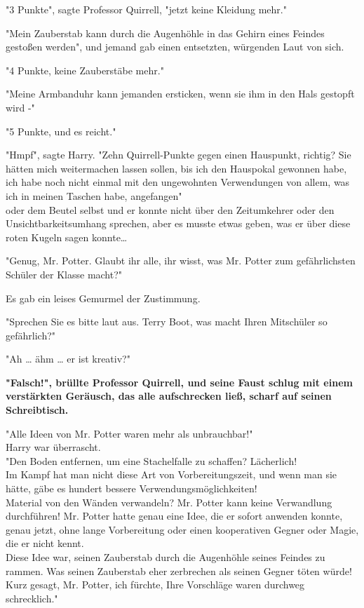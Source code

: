 {"3 Punkte", sagte Professor Quirrell, "jetzt keine Kleidung mehr."

"Mein Zauberstab kann durch die Augenhöhle in das Gehirn eines Feindes gestoßen werden", und jemand gab einen entsetzten, würgenden Laut von sich.

"4 Punkte, keine Zauberstäbe mehr."

"Meine Armbanduhr kann jemanden ersticken, wenn sie ihm in den Hals gestopft wird -"

"5 Punkte, und es reicht."

"Hmpf", sagte Harry. "Zehn Quirrell-Punkte gegen einen Hauspunkt, richtig? Sie hätten mich weitermachen lassen sollen, bis ich den Hauspokal gewonnen habe, ich habe noch nicht einmal mit den ungewohnten Verwendungen von allem, was ich in meinen Taschen habe, angefangen"\\ oder dem Beutel selbst und er konnte nicht über den Zeitumkehrer oder den Unsichtbarkeitsumhang sprechen, aber es musste etwas geben, was er über diese roten Kugeln sagen konnte…

"Genug, Mr. Potter. Glaubt ihr alle, ihr wisst, was Mr. Potter zum gefährlichsten Schüler der Klasse macht?"

Es gab ein leises Gemurmel der Zustimmung.

"Sprechen Sie es bitte laut aus. Terry Boot, was macht Ihren Mitschüler so gefährlich?"

"Ah … ähm … er ist kreativ?"

\textbf{"Falsch!", brüllte Professor Quirrell, und seine Faust schlug mit einem verstärkten Geräusch, das alle aufschrecken ließ, scharf auf seinen Schreibtisch.}

"Alle Ideen von Mr. Potter waren mehr als unbrauchbar!"\\ Harry war überrascht.\\ "Den Boden entfernen, um eine Stachelfalle zu schaffen? Lächerlich!\\ Im Kampf hat man nicht diese Art von Vorbereitungszeit, und wenn man sie hätte, gäbe es hundert bessere Verwendungsmöglichkeiten!\\ Material von den Wänden verwandeln? Mr. Potter kann keine Verwandlung durchführen! Mr. Potter hatte genau eine Idee, die er sofort anwenden konnte, genau jetzt, ohne lange Vorbereitung oder einen kooperativen Gegner oder Magie, die er nicht kennt.\\ Diese Idee war, seinen Zauberstab durch die Augenhöhle seines Feindes zu rammen. Was seinen Zauberstab eher zerbrechen als seinen Gegner töten würde!\\ Kurz gesagt, Mr. Potter, ich fürchte, Ihre Vorschläge waren durchweg schrecklich."

}
